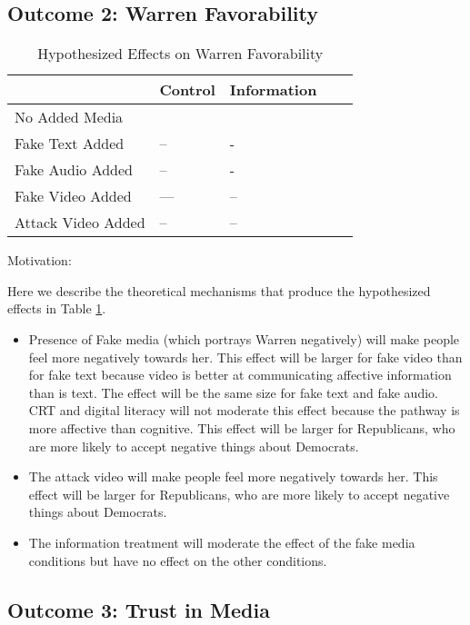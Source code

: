 \subsection{Outcome 2: Warren Favorability}


\clearpage

\begin{table}[]
\caption{Hypothesized Effects on Warren Favorability \label{H2}}
\begin{tabular}{l|llll}
 & Control  & Information &   \\
\hline
No Added Media &  &  &    \\
Fake Text Added & --  & -  & \\
Fake Audio Added & -- & - &   \\
Fake Video Added & --- & -- &   \\
Attack Video Added & -- & -- & 
\end{tabular}
\end{table}

Motivation:

Here we describe the theoretical mechanisms that produce the hypothesized effects in Table \ref{H2}.

\begin{itemize}
    \item Presence of Fake media (which portrays Warren negatively) will make people feel more negatively towards her. This effect will be larger for fake video than for fake text because video is better at communicating affective information than is text. The effect will be the same size for fake text and fake audio. CRT and digital literacy will not moderate this effect because the pathway is more affective than cognitive. This effect will be larger for Republicans, who are more likely to accept negative things about Democrats. 
    
    \item The attack video will make people feel more negatively towards her. This effect will be larger for Republicans, who are more likely to accept negative things about Democrats. 

    \item The information treatment will moderate the effect of the fake media conditions but have no effect on the other conditions.
\end{itemize}




\clearpage




\subsection{Outcome 3: Trust in Media}

